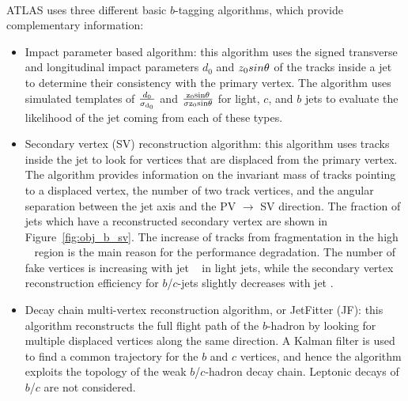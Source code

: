 \paragraph{}
ATLAS uses three different basic $b$-tagging algorithms, which provide complementary information:
\begin{itemize}
	\item Impact parameter based algorithm: this algorithm uses the signed transverse and longitudinal impact parameters $d_0$ and $z_0 sin\rm \theta$ of the tracks inside a jet to determine their consistency with the primary vertex. The algorithm uses simulated templates of $\frac{d_0}{\rm\sigma_{d_0}}$ and $\frac{\rm z_0 sin \theta}{\rm \sigma{\rm z_0 sin\theta}}$ for light, $c$, and $b$ jets to evaluate the likelihood of the jet coming from each of these types.

	\item Secondary vertex (SV) reconstruction algorithm: this algorithm uses tracks inside the jet to look for vertices that are displaced from the primary vertex. The algorithm provides information on the invariant mass of tracks pointing to a displaced vertex, the number of two track vertices, and the angular separation between the jet axis and the PV $\to$ SV direction. The fraction of jets which have a reconstructed secondary vertex are shown in Figure~\ref{fig:obj_b_sv}. The increase of tracks from fragmentation in the high \pt~ region is the main reason for the performance degradation. The number of fake vertices is increasing with jet \pt~ in light jets, while the secondary vertex reconstruction efficiency for $b$/$c$-jets slightly decreases with jet \pt.

	\item Decay chain multi-vertex reconstruction algorithm, or JetFitter (JF): this algorithm reconstructs the full flight path of the $b$-hadron by looking for multiple displaced vertices along the same direction. A Kalman filter is used to find a common trajectory for the $b$ and $c$ vertices, and hence the algorithm exploits the topology of the weak $b$/$c$-hadron decay chain. Leptonic decays of $b$/$c$ are not considered.
\end{itemize}
 

